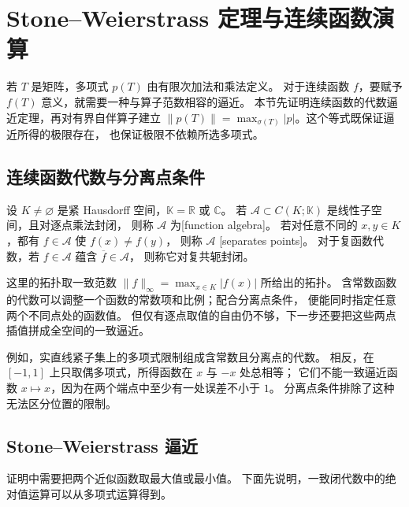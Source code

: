 \section{Stone–Weierstrass 定理与连续函数演算}
\label{b1:sec:2902}

若 \(T\) 是矩阵，多项式 \(p(T)\) 由有限次加法和乘法定义。
对于连续函数 \(f\)，要赋予 \(f(T)\) 意义，就需要一种与算子范数相容的逼近。
本节先证明连续函数的代数逼近定理，再对有界自伴算子建立
\(\|p(T)\|=\max_{\sigma(T)}|p|\)。这个等式既保证逼近所得的极限存在，
也保证极限不依赖所选多项式。

\subsection{连续函数代数与分离点条件}
\label{b1:subsec:290201}

\begin{definition}[函数代数与分离点]
\label{b1:def:29-function-algebra}
设 \(K\ne\varnothing\) 是紧 Hausdorff 空间，\(\mathbb K=\mathbb R\) 或 \(\mathbb C\)。
若 \(\mathcal A\subset C(K;\mathbb K)\) 是线性子空间，且对逐点乘法封闭，
则称 \(\mathcal A\) 为[function algebra]。
若对任意不同的 \(x,y\in K\)，都有 \(f\in\mathcal A\) 使 \(f(x)\ne f(y)\)，
则称 \(\mathcal A\) [separates points]。
对于复函数代数，若 \(f\in\mathcal A\) 蕴含 \(\overline f\in\mathcal A\)，
则称它对复共轭封闭。
\end{definition}

这里的拓扑取一致范数 \(\|f\|_\infty=\max_{x\in K}|f(x)|\) 所给出的拓扑。
含常数函数的代数可以调整一个函数的常数项和比例；配合分离点条件，
便能同时指定任意两个不同点处的函数值。
但仅有逐点取值的自由仍不够，下一步还要把这些两点插值拼成全空间的一致逼近。

\ProseParagraphBreak

例如，实直线紧子集上的多项式限制组成含常数且分离点的代数。
相反，在 \([-1,1]\) 上只取偶多项式，所得函数在 \(x\) 与 \(-x\) 处总相等；
它们不能一致逼近函数 \(x\mapsto x\)，因为在两个端点中至少有一处误差不小于 \(1\)。
分离点条件排除了这种无法区分位置的限制。

\subsection{Stone–Weierstrass 逼近}
\label{b1:subsec:290202}

证明中需要把两个近似函数取最大值或最小值。
下面先说明，一致闭代数中的绝对值运算可以从多项式运算得到。

